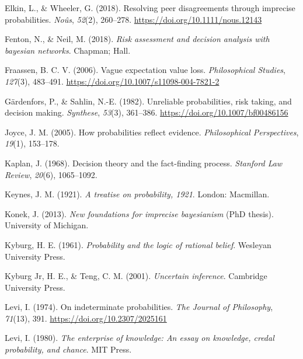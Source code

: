 \documentclass[
  10pt,
  dvipsnames,enabledeprecatedfontcommands]{scrartcl}
\newlength{\cslhangindent}
\newlength{\cslentryspacingunit} %
\newenvironment{CSLReferences}[2] %
 {%
  \setlength{\parindent}{0pt}
  \ifodd #1
  \let\oldpar\par
  \def\par{\hangindent=\cslhangindent\oldpar}
  \fi
  \setlength{\parskip}{#2\cslentryspacingunit}
 }%
 {}
\begin{document}
\begin{CSLReferences}{1}{0}
\leavevmode{}%
Elkin, L., \& Wheeler, G. (2018). Resolving peer disagreements through
imprecise probabilities. \emph{Noûs}, \emph{52}(2), 260--278.
\url{https://doi.org/10.1111/nous.12143}

\leavevmode{}%
Fenton, N., \& Neil, M. (2018). \emph{Risk assessment and decision
analysis with bayesian networks}. Chapman; Hall.

\leavevmode{}%
Fraassen, B. C. V. (2006). Vague expectation value loss.
\emph{Philosophical Studies}, \emph{127}(3), 483--491.
\url{https://doi.org/10.1007/s11098-004-7821-2}

\leavevmode{}%
Gärdenfors, P., \& Sahlin, N.-E. (1982). Unreliable probabilities, risk
taking, and decision making. \emph{Synthese}, \emph{53}(3), 361--386.
\url{https://doi.org/10.1007/bf00486156}

\leavevmode{}%
Joyce, J. M. (2005). How probabilities reflect evidence.
\emph{Philosophical Perspectives}, \emph{19}(1), 153--178.

\leavevmode{}%
Kaplan, J. (1968). Decision theory and the fact-finding process.
\emph{Stanford Law Review}, \emph{20}(6), 1065--1092.

\leavevmode{}%
Keynes, J. M. (1921). \emph{A treatise on probability, 1921}. London:
Macmillan.

\leavevmode{}%
Konek, J. (2013). \emph{New foundations for imprecise bayesianism} (PhD
thesis). University of Michigan.

\leavevmode{}%
Kyburg, H. E. (1961). \emph{Probability and the logic of rational
belief}. Wesleyan University Press.

\leavevmode{}%
Kyburg Jr, H. E., \& Teng, C. M. (2001). \emph{Uncertain inference}.
Cambridge University Press.

\leavevmode{}%
Levi, I. (1974). On indeterminate probabilities. \emph{The Journal of
Philosophy}, \emph{71}(13), 391. \url{https://doi.org/10.2307/2025161}

\leavevmode{}%
Levi, I. (1980). \emph{The enterprise of knowledge: An essay on
knowledge, credal probability, and chance}. MIT Press.


\end{CSLReferences}
\end{document}
